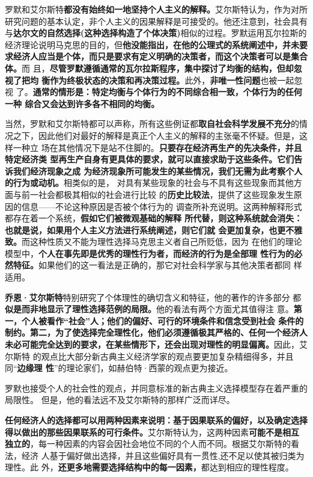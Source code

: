 罗默和艾尔斯特\textbf{都没有始终如一地坚持个人主义的解释。}艾尔斯特认为，作为对所
研究问题的基本认定，非个人主义的因果解释是可接受的。他还注意到，社会具有
与\textbf{达尔文的自然选择(这种选择构造了个体决策)}相似的过程。罗默运用瓦尔拉斯的
经济理论说明马克思的目的，但\textbf{他没能指出，在他的公理式的系统阐述中，并未要
  求经济人应当是个体，而只是要求有定义明确的决策者，而这个决策者可以是集合体。}而
且，\textbf{尽管罗默遵循通常的瓦尔拉斯程序，集中探讨了均衡的结构，但却忽视了把均
  衡作为终极状态的决策和再决策过程。}此外，\textbf{非唯一性问题}也被一起忽视
了。\textbf{通常的情形是：特定均衡与个体行为的不同综合相一致，个体行为的任何一种
  综合又会达到许多各不相同的均衡。}

当然，罗默和艾尔斯特都可以声称，所有这些例证都\textbf{取自社会科学发展不充分}的情
况之下，因此他们对最好的解释是真正个人主义的解释的主张毫不怀疑。但是，这样一种立
场在其他情况下是站不住脚的。\textbf{只要存在经济再生产的先决条件，并且特定经济类
  型再生产自身有更具体的要求，就可以直接求助于这些条件。它们告诉我们经济现象之成
  为经济现象所可能发生的某些情况，我们无需为此考察个人的行为或动机。}相类似的是，
对具有某些现象的社会与不具有这些现象而其他方面与前一社会都极其相似的社会进行比较
的\textbf{历史比较法}，提供了这些现象发生原因的信息——不论这种原因是否被个体行为的
调查所补充说明。这两种解释形式都存在着一个系统，\textbf{假如它们被微观基础的解释
  所代替，则这种系统就会消失：也就是说，如果用个人主义方法进行系统阐述，则它们就
  会更加复杂，也更不雅致。}而这种性质又不能为理性选择马克思主义者自己所贬低，因为
在他们的理论模型中，\textbf{个人在事先即是优秀的理性行为者，而经济的行为是全部理
  性行为的必然特征。}如果他们的这一看法是正确的，那它对社会科学家与其他决策者都同
样适用。

\textbf{乔恩·艾尔斯特}特别研究了个体理性的确切含义和特征，他的著作的许多部分
都\textbf{似是而非地显示了理性选择范例的局限。}他的看法有两个方面尤其值得注
意。\textbf{第一，个人被看作“社会”人；他们的偏好、可行的环境条件和信念受到社会
  条件的制约。第二，为了使选择完全理性化，他们必须遵循极其严格的、任何一个经济人
  未必可能完全达到的要求，在某些情形下，还会出现对理性的明显偏离。}因此，艾尔斯特
的观点比大部分新古典主义经济学家的观点要更加复杂精细得多，并且同“\textbf{边缘理
  性}”的理论家们，如赫伯特·西蒙的观点更为接近。

罗默也接受个人的社会性的观点，并同意标准的新古典主义选择模型存在着严重的局限性。
但是，他的看法远不及艾尔斯特的那样广泛而详尽。

\textbf{任何经济人的选择都可以用两种因素来说明：基于因果联系的偏好，以及确定选择
  得以做出的那些因果联系的可行条件。}艾尔斯特认为，这两种因素\textbf{可能不是相互
  独立的}，每一种因素的内容会因社会地位不同的个人而不同。根据艾尔斯特的看法，经济
人基于偏好做出选择，并且这些偏好具有一贯性,还不足以使其被归类为理性。此
外，\textbf{还更多地需要选择结构中的每一因素，}都达到相应的理性程度。

